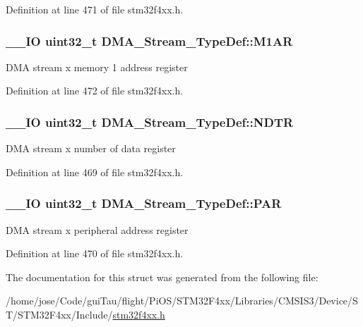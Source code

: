 Definition at line 471 of file stm32f4xx.\-h.

\hypertarget{struct_d_m_a___stream___type_def_a142ca5a1145ba9cf4cfa557655af1c13}{
\subsubsection[{M1\-A\-R}]{\setlength{\rightskip}{0pt plus 5cm}\-\_\-\-\_\-\-I\-O {\bf uint32\-\_\-t} D\-M\-A\-\_\-\-Stream\-\_\-\-Type\-Def\-::\-M1\-A\-R}}\label{struct_d_m_a___stream___type_def_a142ca5a1145ba9cf4cfa557655af1c13}
D\-M\-A stream x memory 1 address register 

Definition at line 472 of file stm32f4xx.\-h.

\hypertarget{struct_d_m_a___stream___type_def_a2cc2a52628182f9e79ab1e49bb78a1eb}{
\subsubsection[{N\-D\-T\-R}]{\setlength{\rightskip}{0pt plus 5cm}\-\_\-\-\_\-\-I\-O {\bf uint32\-\_\-t} D\-M\-A\-\_\-\-Stream\-\_\-\-Type\-Def\-::\-N\-D\-T\-R}}\label{struct_d_m_a___stream___type_def_a2cc2a52628182f9e79ab1e49bb78a1eb}
D\-M\-A stream x number of data register 

Definition at line 469 of file stm32f4xx.\-h.

\hypertarget{struct_d_m_a___stream___type_def_adbeac1d47cb85ab52dac71d520273947}{
\subsubsection[{P\-A\-R}]{\setlength{\rightskip}{0pt plus 5cm}\-\_\-\-\_\-\-I\-O {\bf uint32\-\_\-t} D\-M\-A\-\_\-\-Stream\-\_\-\-Type\-Def\-::\-P\-A\-R}}\label{struct_d_m_a___stream___type_def_adbeac1d47cb85ab52dac71d520273947}
D\-M\-A stream x peripheral address register 

Definition at line 470 of file stm32f4xx.\-h.



The documentation for this struct was generated from the following file\-:\begin{DoxyCompactItemize}
\item 
/home/jose/\-Code/gui\-Tau/flight/\-Pi\-O\-S/\-S\-T\-M32\-F4xx/\-Libraries/\-C\-M\-S\-I\-S3/\-Device/\-S\-T/\-S\-T\-M32\-F4xx/\-Include/\hyperlink{stm32f4xx_8h}{stm32f4xx.\-h}\end{DoxyCompactItemize}
